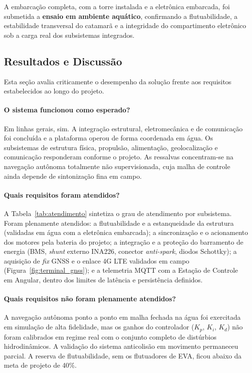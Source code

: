 \documentclass[12pt,a4paper]{article}
\begin{document}
A embarcação completa, com a torre instalada e a eletrônica embarcada, foi submetida a \textbf{ensaio em ambiente aquático}, confirmando a flutuabilidade, a estabilidade transversal do catamarã e a integridade do compartimento eletrônico sob a carga real dos subsistemas integrados.

\subsection{Resultados e Discussão}

Esta seção avalia criticamente o desempenho da solução frente aos requisitos estabelecidos ao longo do projeto.

\paragraph{O sistema funcionou como esperado?} Em linhas gerais, sim. A integração estrutural, eletromecânica e de comunicação foi concluída e a plataforma operou de forma coordenada em água. Os subsistemas de estrutura física, propulsão, alimentação, geolocalização e comunicação responderam conforme o projeto. As ressalvas concentram-se na navegação autônoma totalmente não supervisionada, cuja malha de controle ainda depende de sintonização fina em campo.

\paragraph{Quais requisitos foram atendidos?} A Tabela~\ref{tab:atendimento} sintetiza o grau de atendimento por subsistema. Foram plenamente atendidos: a flutuabilidade e a estanqueidade da estrutura (validadas em água com a eletrônica embarcada); a sincronização e o acionamento dos motores pela bateria do projeto; a integração e a proteção do barramento de energia (BMS, \textit{shunt} externo INA226, conector \textit{anti-spark}, diodos Schottky); a aquisição de \textit{fix} GNSS e o enlace 4G LTE validados em campo (Figura~\ref{fig:terminal_gnss}); e a telemetria MQTT com a Estação de Controle em Angular, dentro dos limites de latência e persistência definidos.

\paragraph{Quais requisitos não foram plenamente atendidos?} A navegação autônoma ponto a ponto em malha fechada na água foi exercitada em simulação de alta fidelidade, mas os ganhos do controlador ($K_p$, $K_i$, $K_d$) não foram calibrados em regime real com o conjunto completo de distúrbios hidrodinâmicos. A validação do sistema anticolisão em movimento permaneceu parcial. A reserva de flutuabilidade, sem os flutuadores de EVA, ficou abaixo da meta de projeto de 40\%.
\end{document}

